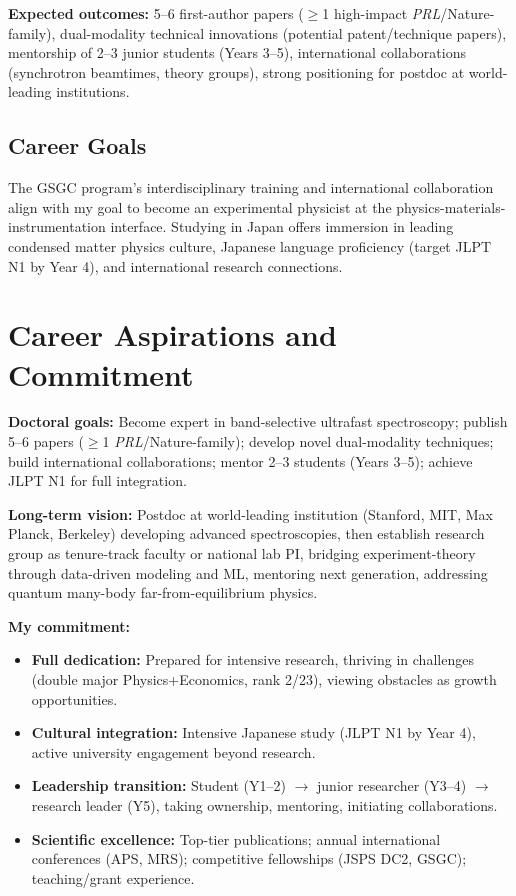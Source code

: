 \documentclass[11pt,a4paper]{article}
\begin{document}
\textbf{Expected outcomes:} 5--6 first-author papers ($\geq$1 high-impact \textit{PRL}/Nature-family), dual-modality technical innovations (potential patent/technique papers), mentorship of 2--3 junior students (Years 3--5), international collaborations (synchrotron beamtimes, theory groups), strong positioning for postdoc at world-leading institutions.

\subsection{Career Goals}

The GSGC program's interdisciplinary training and international collaboration align with my goal to become an experimental physicist at the physics-materials-instrumentation interface. Studying in Japan offers immersion in leading condensed matter physics culture, Japanese language proficiency (target JLPT N1 by Year 4), and international research connections.

\section{Career Aspirations and Commitment}

\textbf{Doctoral goals:} Become expert in band-selective ultrafast spectroscopy; publish 5--6 papers ($\geq$1 \textit{PRL}/Nature-family); develop novel dual-modality techniques; build international collaborations; mentor 2--3 students (Years 3--5); achieve JLPT N1 for full integration.

\textbf{Long-term vision:} Postdoc at world-leading institution (Stanford, MIT, Max Planck, Berkeley) developing advanced spectroscopies, then establish research group as tenure-track faculty or national lab PI, bridging experiment-theory through data-driven modeling and ML, mentoring next generation, addressing quantum many-body far-from-equilibrium physics.

\textbf{My commitment:}
\begin{itemize}
    \item \textbf{Full dedication:} Prepared for intensive research, thriving in challenges (double major Physics+Economics, rank 2/23), viewing obstacles as growth opportunities.
    \item \textbf{Cultural integration:} Intensive Japanese study (JLPT N1 by Year 4), active university engagement beyond research.
    \item \textbf{Leadership transition:} Student (Y1--2) $\to$ junior researcher (Y3--4) $\to$ research leader (Y5), taking ownership, mentoring, initiating collaborations.
    \item \textbf{Scientific excellence:} Top-tier publications; annual international conferences (APS, MRS); competitive fellowships (JSPS DC2, GSGC); teaching/grant experience.
\end{itemize}
\end{document}
